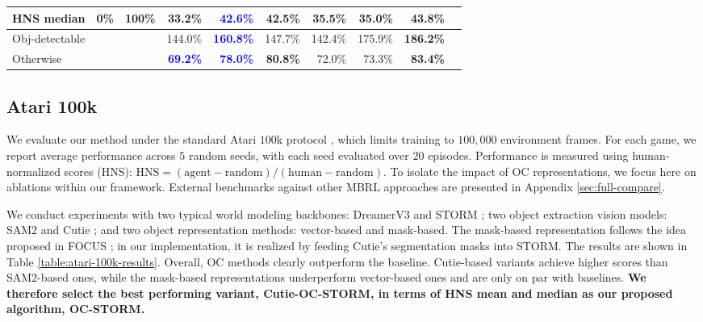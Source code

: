 \documentclass{article} %
\begin{document}
\begin{table}[h]
{\begin{tabular}{lrr|rr|rrrr|r}
    HNS median & 0\% & 100\%  & 33.2\% & \textcolor{Blue}{\textbf{42.6\%}} & \textcolor{BrickRed}{\textbf{42.5\%}} & 35.5\% & 35.0\% & \textcolor{BrickRed}{\textbf{43.8\%}} \\
    \midrule
    Obj-detectable & & & 144.0\% & \textcolor{Blue}{\textbf{160.8\%}} & 147.7\% & 142.4\% & 175.9\% & \textcolor{BrickRed}{\textbf{186.2\%}} & \\
    Otherwise & & & \textcolor{Blue}{\textbf{69.2\%}} & \textcolor{Blue}{\textbf{78.0\%}} & \textcolor{BrickRed}{\textbf{80.8\%}} & 72.0\% & 73.3\% & \textcolor{BrickRed}{\textbf{83.4\%}} & \\
    \bottomrule
    \end{tabular}}
\end{table}

\subsection{Atari 100k} \label{sec:atari-results}
We evaluate our method under the standard Atari $100$k protocol \citep{kaiser_model_2019}, which limits training to $100,000$ environment frames. For each game, we report average performance across $5$ random seeds, with each seed evaluated over $20$ episodes. Performance is measured using human-normalized scores (HNS):  $\text{HNS} = (\text{agent} - \text{random}) / (\text{human} - \text{random})$. 
To isolate the impact of OC representations, we focus here on ablations within our framework. External benchmarks against other MBRL approaches are presented in Appendix \ref{sec:full-compare}.

We conduct experiments with two typical world modeling backbones: DreamerV3 \citep{hafner_mastering_2023} and STORM \citep{zhang_storm_2023}; two object extraction vision models: SAM2 \citep{hafner_mastering_2023} and Cutie \citep{cheng_putting_2023}; and two object representation methods: vector-based and mask-based.
The mask-based representation follows the idea proposed in FOCUS \citep{ferraro_focus_2023}; in our implementation, it is realized by feeding Cutie’s segmentation masks into STORM.
The results are shown in Table \ref{table:atari-100k-results}.
Overall, OC methods clearly outperform the baseline.
Cutie-based variants achieve higher scores than SAM2-based ones, while the mask-based representations underperform vector-based ones and are only on par with baselines.
\textbf{We therefore select the best performing variant, Cutie-OC-STORM, in terms of HNS mean and median as our proposed algorithm, OC-STORM.}
\end{document}
